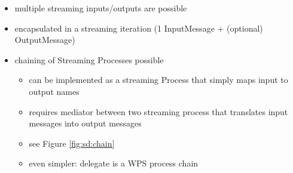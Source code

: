 \begin{itemize}
			\item multiple streaming inputs/outputs are possible
			\item encapsulated in a streaming iteration (1 InputMessage + (optional) OutputMessage)
			\item chaining of Streaming Processes possible
			\begin{itemize}
				\item can be implemented as a streaming Process that simply maps input to output names
				\item requires mediator between two streaming process that translates input messages into output messages
				\item see Figure \ref{fig:sd:chain}
				\item even simpler: delegate is a WPS process chain
			\end{itemize}
		\end{itemize}
